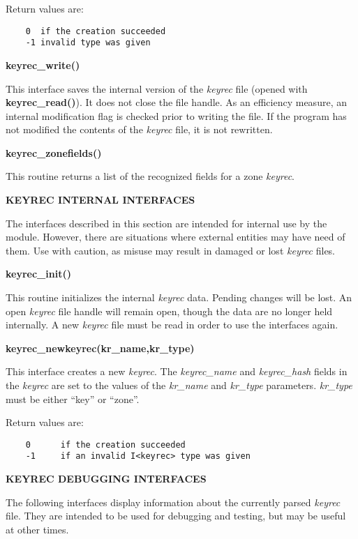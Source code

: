 Return values are:

\begin{verbatim}
    0  if the creation succeeded
    -1 invalid type was given
\end{verbatim}

{\bf keyrec\_write()}

This interface saves the internal version of the {\it keyrec} file (opened with
{\bf keyrec\_read()}).  It does not close the file handle.  As an efficiency
measure, an internal modification flag is checked prior to writing the file.
If the program has not modified the contents of the {\it keyrec} file, it is not
rewritten.

{\bf keyrec\_zonefields()}

This routine returns a list of the recognized fields for a zone {\it keyrec}.

{\bf KEYREC INTERNAL INTERFACES}

The interfaces described in this section are intended for internal use by the
 module.  However, there are
situations where external entities may have need of them.  Use with caution,
as misuse may result in damaged or lost {\it keyrec} files.

{\bf keyrec\_init()}

This routine initializes the internal {\it keyrec} data.  Pending changes
will be lost.  An open {\it keyrec} file handle will remain open, though the
data are no longer held internally.  A new {\it keyrec} file must be read in
order to use the  interfaces
again.

{\bf keyrec\_newkeyrec(kr\_name,kr\_type)}

This interface creates a new {\it keyrec}.  The {\it keyrec\_name} and {\it
keyrec\_hash} fields in the {\it keyrec} are set to the values of the {\it
kr\_name} and {\it kr\_type} parameters.  {\it kr\_type} must be either
``key'' or ``zone''.

Return values are:

\begin{verbatim}
    0      if the creation succeeded
    -1     if an invalid I<keyrec> type was given
\end{verbatim}

{\bf KEYREC DEBUGGING INTERFACES}

The following interfaces display information about the currently parsed
{\it keyrec} file.  They are intended to be used for debugging and testing,
but may be useful at other times.

